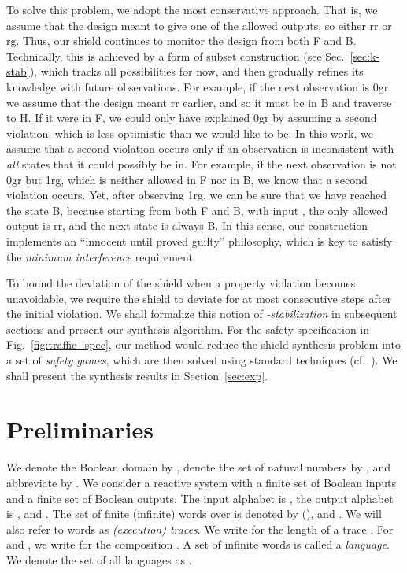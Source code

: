\documentclass{llncs}
\begin{document}
To solve this problem, we adopt the most conservative approach. That is, 
we assume that the design  meant to give one of the allowed 
outputs, so either \textsf{rr} or \textsf{rg}. Thus, our shield 
continues to monitor the design from both F and B.  Technically, this is 
achieved by a form of subset construction (see Sec.~\ref{sec:k-stab}), 
which tracks all possibilities for now, and then gradually refines its 
knowledge with future observations.  For example, if the next 
observation is \textsf{0gr}, we assume that the design  meant 
\textsf{rr} earlier, and so it must be in B and traverse to H.
If it were in F, we could only have explained \textsf{0gr} by assuming a 
second violation, which is less optimistic than we would like to be.  
In this work, we assume that a second violation occurs only if an 
observation is inconsistent with \emph{all} states that it could 
possibly be in.  For example, if the next observation is not 
\textsf{0gr} but \textsf{1rg}, which is neither allowed in F nor in B, 
we know that a second violation occurs.  Yet, after observing 
\textsf{1rg}, we can be sure that we have reached the state B, because 
starting from both F and B, with input , the only allowed 
output is \textsf{rr}, and the next state is always B.
In this sense, our construction implements an ``innocent until proved 
guilty'' philosophy, which is key to satisfy the \emph{minimum 
interference} requirement.

To bound the deviation of the shield when a property violation becomes 
unavoidable, we require the shield to deviate for at most  
consecutive steps after the initial violation.  We shall formalize this 
notion of \emph{-stabilization} in subsequent sections and present 
our synthesis algorithm.
For the safety specification in Fig.~\ref{fig:traffic_spec}, our method 
would reduce the shield synthesis problem into a set of \emph{safety 
games}, which are then solved using standard techniques 
(cf.~\cite{Mazala01}).  We shall present the synthesis results in 
Section~\ref{sec:exp}.

\section{Preliminaries}
\label{sec:prelim}

We denote the Boolean domain by , denote the set of 
natural numbers by , and abbreviate  by 
.
We consider a reactive system with a finite set 
 of Boolean inputs and a finite set 
 of Boolean outputs.  The input alphabet is 
, the output alphabet is , and 
. The set of finite (infinite) words 
over  is denoted by  (), and 
.  We will also refer 
to words as \emph{(execution) traces}.  We write  for the 
length of a trace . For  and , we write  for the 
composition . A set  of infinite words is called a \emph{language}. 
We denote the set of all languages as .
\end{document}
